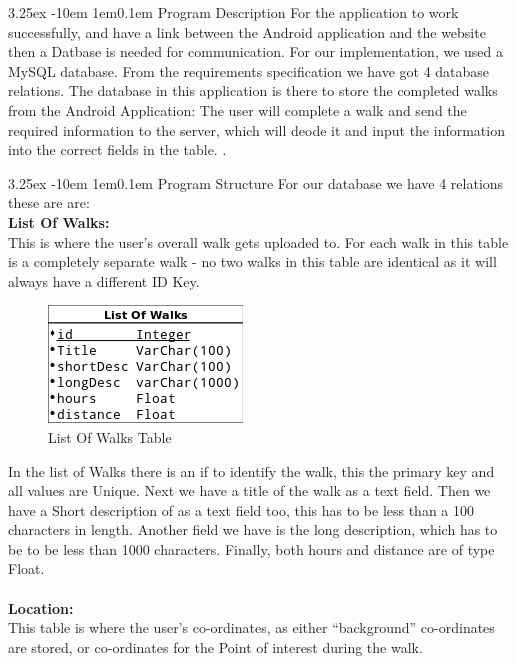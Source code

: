 \documentclass[12pt]{article}
\makeatletter
\renewcommand{\paragraph}{
  \@startsection{paragraph}{4}
  {\z@}{3.25ex \@plus -10em \@minus 1em}{0.1em}
  {\normalfont\normalsize\bfseries}
}
\makeatother
\begin{document}
\paragraph{Program Description}
For the application to work successfully, and have a link between the Android application and the website then a Datbase is needed for communication. For our implementation, we used a MySQL database. From the requirements specification we have got 4 database relations. The database in this application is there to store the completed walks from the Android Application: The user will complete a walk and send the required information to the server, which will deode it and input the information into the correct fields in the table. 
.
\paragraph{Program Structure}	
For our database we have 4 relations these are are: 
	\\
	\indent\textbf{List Of Walks:}~\\
	This is where the user's overall walk gets uploaded to. For each walk in this table is a completely separate walk - no two walks in this table are identical as it will always have a different ID Key.
		\begin{figure}[htp]
\centering
\includegraphics[scale=0.60]{Final_report/List_of_Walks.png}
\caption{List Of Walks Table}
\label{List Of Walks Table}
\end{figure}
In the list of Walks there is an if to identify the walk, this the primary key and all values are Unique. Next we have a title of the walk as a text field. Then we have a Short description of as a text field too, this has to be less than a 100 characters in length. Another field we have is the long description, which has to be to be less than 1000 characters. Finally, both hours and distance are of type Float. ~\\
~\\
	\indent\textbf{Location:}~\\\clearpage
	This table is where the user's co-ordinates, as either ``background'' co-ordinates are stored, or co-ordinates for the Point of interest during the walk. 
\end{document}
